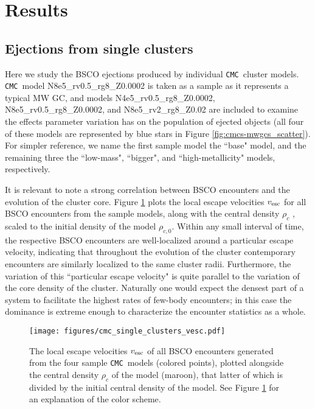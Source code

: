 \documentclass[twocolumn]{aastex631}
\newcommand{\CMC}{\texttt{CMC}}
\begin{document}
\section{Results} \label{sec:results}

\subsection{Ejections from single clusters} \label{subsec:single_clusters}

Here we study the BSCO ejections produced by individual \CMC\ cluster models.
\CMC\ model N8e5\_rv0.5\_rg8\_Z0.0002 is taken as a sample as it represents a typical MW GC, and models N4e5\_rv0.5\_rg8\_Z0.0002, N8e5\_rv0.5\_rg8\_Z0.0002, and N8e5\_rv2\_rg8\_Z0.02 are included to examine the effects parameter variation has on the population of ejected objects (all four of these models are represented by blue stars in Figure \ref{fig:cmcs-mwgcs_scatter}).
For simpler reference, we name the first sample model the ``base" model, and the remaining three the ``low-mass", ``bigger", and ``high-metallicity" models, respectively.

It is relevant to note a strong correlation between BSCO encounters and the evolution of the cluster core.
Figure \ref{fig:cmc_single_clusters_vesc} plots the local escape velocities $v_{\rm esc}$ for all BSCO encounters from the sample models, along with the central density $\rho_c$ \citep{1985ApJ...298...80C}, scaled to the initial density of the model $\rho_{c,0}$.
Within any small interval of time, the respective BSCO encounters are well-localized around a particular escape velocity, indicating that throughout the evolution of the cluster contemporary encounters are similarly localized to the same cluster radii.
Furthermore, the variation of this ``particular escape velocity" is quite parallel to the variation of the core density of the cluster.
Naturally one would expect the densest part of a system to facilitate the highest rates of few-body encounters; in this case the dominance is extreme enough to characterize the encounter statistics as a whole.

\begin{figure}
    \centering
    \texttt{[image: figures/cmc\_single\_clusters\_vesc.pdf]}
    \caption{
        The local escape velocities $v_{\rm esc}$ of all BSCO encounters generated from the four sample \CMC\ models (colored points), plotted alongside the central density $\rho_c$ of the model (maroon), that latter of which is divided by the initial central density of the model.
        See Figure \ref{fig:cmc_single_clusters_vesc} for an explanation of the color scheme.
    }
    \label{fig:cmc_single_clusters_vesc}
\end{figure}
\end{document}
